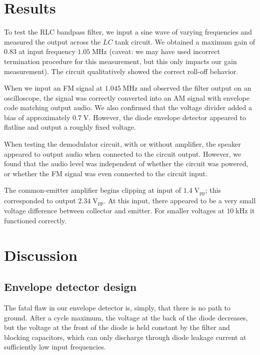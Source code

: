 \documentclass[11pt]{article}
\newcommand {\mt}{\mathrm}
\newcommand {\unit}[1]{\; \mt{#1}}
\begin{document}
\section{Results}

To test the RLC bandpass filter, we input a sine wave of varying frequencies
and measured the output across the $LC$ tank circuit.  We obtained a maximum
gain of $0.83$ at input frequency $1.05 \unit{MHz}$ (caveat: we may have used
incorrect termination procedure for this measurement, but this only impacts our
gain measurement).  The circuit qualitatively showed the correct roll-off
behavior.

When we input an FM signal at $1.045 \unit{MHz}$ and observed the
filter output on an oscilloscope, the signal was correctly converted into
an AM signal with envelope code matching output audio.  We also confirmed that
the voltage divider added a bias of approximately $0.7 \unit{V}$.
However, the diode envelope detector appeared to flatline and output a roughly
fixed voltage.

When testing the demodulator circuit, with or without amplifier, the speaker
appeared to output audio when connected to the circuit output.  However, we
found that the audio level was independent of whether the circuit was powered,
or whether the FM signal was even connected to the circuit input.

The common-emitter amplifier begins clipping at input of
$1.4 \unit{V_{\mt{pp}}}$; this corresponded to output
$2.34 \unit{V_{\mt{pp}}}$.  At this input, there appeared to be a very small
voltage difference between collector and emitter.
For smaller voltages at $10 \unit{kHz}$ it functioned correctly.

\section{Discussion}

\subsection{Envelope detector design}

The fatal flaw in our envelope detector is, simply, that there is no path to
ground. After a cycle maximum, the voltage at the back of the diode decreases,
but the voltage at the front of the diode is held constant by the filter and
blocking capacitors, which can only discharge through diode leakage current at
sufficiently low input frequencies.
\end{document}
